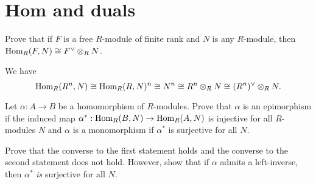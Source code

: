 \documentclass[../../master.tex]{subfiles}
\begin{document}
\section{Hom and duals}

\begin{problem}
    Prove that if $F$ is a free $R$-module of finite rank and $N$ is any $R$-module, then $\operatorname{Hom}_R(F, N) \cong F^{\vee} \otimes_R N$.
\end{problem}

\begin{solution}
    We have
    \[
    \operatorname{Hom}_R(R^{n}, N) \cong \operatorname{Hom}_R(R, N)^{n} \cong N^{n} \cong R^{n} \otimes_R N \cong (R^{n})^{\vee} \otimes_R N.
    \]
\end{solution}

\begin{problem}
    Let $\alpha : A \to B$ be a homomorphism of $R$-modules.
    Prove that $\alpha$ is an epimorphism if the induced map $\alpha^{*} : \operatorname{Hom}_R(B, N) \to \operatorname{Hom}_R(A, N)$ is injective for all $R$-modules $N$ and $\alpha$ is a monomorphism if $\alpha^{*}$ is surjective for all $N$.

    Prove that the converse to the first statement holds and the converse to the second statement does not hold.
    However, show that if $\alpha$ admits a left-inverse, then $\alpha^{*}$ \textit{is} surjective for all $N$.
\end{problem}
\end{document}
